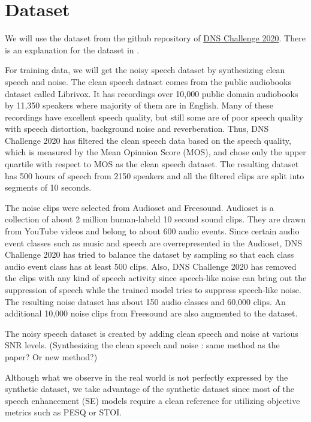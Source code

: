 \documentclass[11pt]{article}
\begin{document}
\section{Dataset}

We will use the dataset from the github repository of \href{https://github.com/microsoft/DNS-Challenge}{DNS Challenge 2020}. There is an explanation for the dataset in \cite{DNSchallenge2020}. 

For training data, we will get the noisy speech dataset by synthesizing clean speech and noise. The clean speech dataset comes from the public audiobooks dataset called Librivox. It has recordings over 10,000 public domain audiobooks by 11,350 speakers where majority of them are in English. Many of these recordings have excellent speech quality, but still some are of poor speech quality with speech distortion, background noise and reverberation. Thus, DNS Challenge 2020 has filtered the clean speech data based on the speech quality, which is measured by the Mean Opinnion Score (MOS), and chose only the upper quartile with respect to MOS as the clean speech dataset. The resulting dataset has 500 hours of speech from 2150 speakers and all the filtered clips are split into segments of 10 seconds.

The noise clips were selected from Audioset and Freesound. Audioset is a collection of about 2 million human-labeld 10 second sound clips. They are drawn from YouTube videos and belong to about 600 audio events. Since certain audio event classes such as music and speech are overrepresented in the Audioset, DNS Challenge 2020 has tried to balance the dataset by sampling so that each class audio event class has at least 500 clips. Also, DNS Challenge 2020 has removed the clips with any kind of speech activity since speech-like noise can bring out the suppression of speech while the trained model tries to suppress speech-like noise. The resulting noise dataset has about 150 audio classes and 60,000 clips. An additional 10,000 noise clips from Freesound are also augmented to the dataset.

The noisy speech dataset is created by adding clean speech and noise at various SNR levels. (Synthesizing the clean speech and noise : same method as the paper? Or new method?)

Although what we observe in the real world is not perfectly expressed by the synthetic dataset, we take advantage of the synthetic dataset since most of the speech enhancement (SE) models require a clean reference for utilizing objective metrics such as PESQ or STOI.
\end{document}
